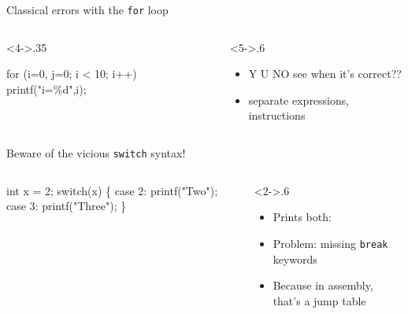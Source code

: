 \begin{frame}{Classical errors with the \texttt{for} loop}
  \begin{columns}
    \begin{column}<4->{.35\linewidth}
      \begin{boitecode}{}
for (\alert<5>{i=0, j=0}; i < 10; i++)
   printf("i=\%d\n",i);
      \end{boitecode}
    \end{column}

    \begin{column}<5->{.6\linewidth}
      \begin{itemize}\vspace{-1.3\baselineskip}
      \item Y U NO see when it's correct??
      \item[] \framebox{,} separate expressions, \framebox{;} instructions
      \end{itemize}
    \end{column}
  \end{columns}
\end{frame}

\begin{frame}[fragile]{Beware of the vicious \texttt{switch} syntax!}
  \begin{columns}
    \begin{column}{.23\linewidth}
      \begin{boitecode}{}
int x = 2;
switch(x) \{
  case 2:
    printf("Two\n");
  case 3:
    printf("Three\n");
\}     
      \end{boitecode}
    \end{column}
    \begin{column}<2->{.6\linewidth}
      \begin{itemize}
      \item Prints both: 
      \item Problem: missing \texttt{break} keywords
      \item Because in assembly, that's a jump table
      \end{itemize}
    \end{column}
  \end{columns}

\end{frame}

